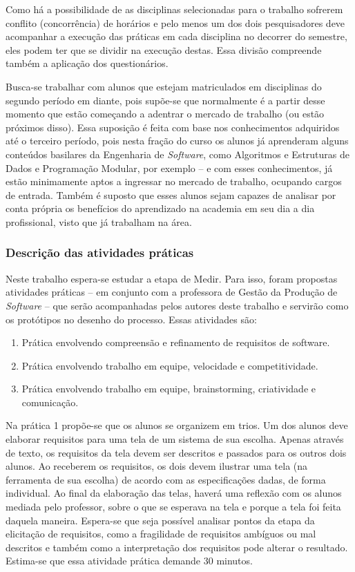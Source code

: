 Como há a possibilidade de as disciplinas selecionadas para o trabalho sofrerem conflito (concorrência) de horários e pelo menos um dos dois pesquisadores deve acompanhar a execução das práticas em cada disciplina no decorrer do semestre, eles podem ter que se dividir na execução destas. Essa divisão compreende também a aplicação dos questionários.

Busca-se trabalhar com alunos que estejam matriculados em disciplinas do segundo período em diante, pois supõe-se que normalmente é a partir desse momento que estão começando a adentrar o mercado de trabalho (ou estão próximos disso). Essa suposição é feita com base nos conhecimentos adquiridos até o terceiro período, pois nesta fração do curso os alunos já aprenderam alguns conteúdos basilares da Engenharia de \textit{Software}, como Algoritmos e Estruturas de Dados e Programação Modular, por exemplo -- e com esses conhecimentos, já estão minimamente aptos a ingressar no mercado de trabalho, ocupando cargos de entrada. Também é suposto que esses alunos sejam capazes de analisar por conta própria os benefícios do aprendizado na academia em seu dia a dia profissional, visto que já trabalham na área.

\subsubsection{Descrição das atividades práticas}

Neste trabalho espera-se estudar a etapa de Medir. Para isso, foram propostas atividades práticas -- em conjunto com a professora de Gestão da Produção de \textit{Software} -- que serão acompanhadas pelos autores deste trabalho e servirão como os protótipos no desenho do processo. Essas atividades são: 

    \begin{enumerate}\setlength\itemsep{0.5em}
        \item Prática envolvendo compreensão e refinamento de requisitos de software.
        \item Prática envolvendo trabalho em equipe, velocidade e competitividade.
        \item Prática envolvendo trabalho em equipe, brainstorming, criatividade e comunicação.
    \end{enumerate}

Na prática 1 propõe-se que os alunos se organizem em trios. Um dos alunos deve elaborar requisitos para uma tela de um sistema de sua escolha. Apenas através de texto, os requisitos da tela devem ser descritos e passados para os outros dois alunos. Ao receberem os requisitos, os dois devem ilustrar uma tela (na ferramenta de sua escolha) de acordo com as especificações dadas, de forma individual. Ao final da elaboração das telas, haverá uma reflexão com os alunos mediada pelo professor, sobre o que se esperava na tela e porque a tela foi feita daquela maneira. Espera-se que seja possível analisar pontos da etapa da elicitação de requisitos, como a fragilidade de requisitos ambíguos ou mal descritos e também como a interpretação dos requisitos pode alterar o resultado. Estima-se que essa atividade prática demande 30 minutos.

